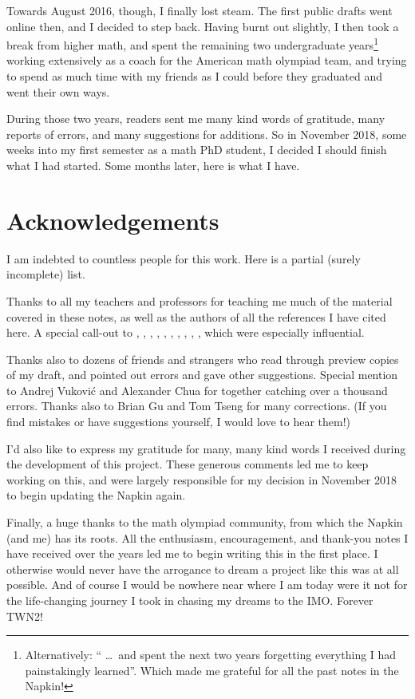 Towards August 2016, though, I finally lost steam.
The first public drafts went online then, and I decided to step back.
Having burnt out slightly,
I then took a break from higher math,
and spent the remaining two undergraduate years\footnote{Alternatively:
	`` \dots\ and spent the next two years forgetting everything
	I had painstakingly learned''.
	Which made me grateful for all the past notes in the Napkin!}
working extensively as a coach for the American math olympiad team,
and trying to spend as much time with my friends as I could
before they graduated and went their own ways.

During those two years, readers sent me many kind words of gratitude,
many reports of errors, and many suggestions for additions.
So in November 2018,
some weeks into my first semester as a math PhD student,
I decided I should finish what I had started.
Some months later, here is what I have.

\section*{Acknowledgements}
I am indebted to countless people for this work.
Here is a partial (surely incomplete) list.

\begin{itemize}
\ii Thanks to all my teachers and professors for teaching me much of the
material covered in these notes,
as well as the authors of all the references I have cited here.
A special call-out to \cite{ref:55a}, \cite{ref:msci},
\cite{ref:manifolds}, \cite{ref:gathmann}, \cite{ref:18-435},
\cite{ref:etingof}, \cite{ref:145a}, \cite{ref:vakil},
\cite{ref:pugh}, \cite{ref:gorin},
which were especially influential.

\ii Thanks also to dozens of friends and strangers
who read through preview copies of my draft,
and pointed out errors and gave other suggestions.
Special mention to Andrej Vukovi\'c and Alexander Chua
for together catching over a thousand errors.
Thanks also to Brian Gu and Tom Tseng for many corrections.
(If you find mistakes or have suggestions yourself,
I would love to hear them!)

\ii I'd also like to express my gratitude for
many, many kind words I received
during the development of this project.
These generous comments led me to keep working on this,
and were largely responsible for my decision in November 2018
to begin updating the Napkin again.
\end{itemize}

Finally, a huge thanks to the math olympiad community,
from which the Napkin (and me) has its roots.
All the enthusiasm, encouragement, and thank-you notes I have received
over the years led me to begin writing this in the first place.
I otherwise would never have the arrogance to dream a project like this
was at all possible.
And of course I would be nowhere near where I am today were it not for the
life-changing journey I took in chasing my dreams to the IMO\@.
Forever TWN2!
